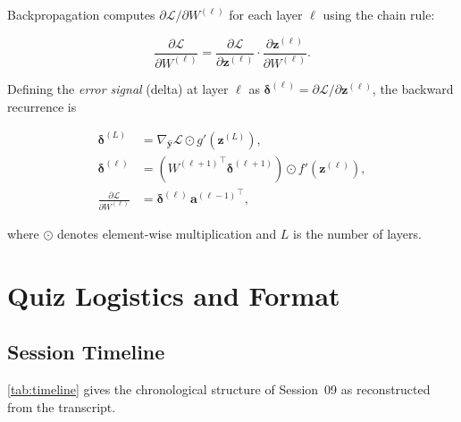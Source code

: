 \documentclass[12pt,a4paper]{article}
\newcommand{\loss}{\mathcal{L}}
\begin{document}
Backpropagation computes $\partial \loss / \partial W^{(\ell)}$ for
each layer $\ell$ using the chain rule:

\begin{equation}
  \frac{\partial \loss}{\partial W^{(\ell)}}
  = \frac{\partial \loss}{\partial \mathbf{z}^{(\ell)}}
    \cdot
    \frac{\partial \mathbf{z}^{(\ell)}}{\partial W^{(\ell)}}.
  \label{eq:chain}
\end{equation}

\noindent
Defining the \emph{error signal} (delta) at layer $\ell$ as
$\boldsymbol{\delta}^{(\ell)} = \partial \loss / \partial
\mathbf{z}^{(\ell)}$, the backward recurrence is

\begin{align}
  \boldsymbol{\delta}^{(L)} &= \nabla_{\hat{\mathbf{y}}}\loss
    \odot g'\!\left(\mathbf{z}^{(L)}\right), \label{eq:delta_L} \\
  \boldsymbol{\delta}^{(\ell)} &=
    \left({W^{(\ell+1)}}^{\!\top}\boldsymbol{\delta}^{(\ell+1)}\right)
    \odot f'\!\left(\mathbf{z}^{(\ell)}\right), \label{eq:delta_l} \\
  \frac{\partial\loss}{\partial W^{(\ell)}} &=
    \boldsymbol{\delta}^{(\ell)}\,{\mathbf{a}^{(\ell-1)}}^{\!\top}, \label{eq:dL_dW}
\end{align}

\noindent
where $\odot$ denotes element-wise multiplication and $L$ is the number
of layers.

\section{Quiz Logistics and Format}
\label{sec:quiz_logistics}

\subsection{Session Timeline}
\label{ssec:timeline}

\cref{tab:timeline} gives the chronological structure of Session~09 as
reconstructed from the transcript.
\end{document}

